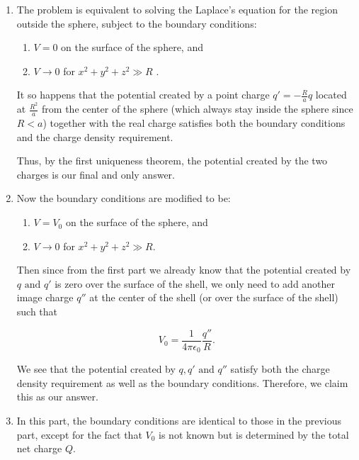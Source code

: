 \documentclass[english,a4paper,12pt]{report}
\begin{document}
{\begin{enumerate}
    \item The problem is equivalent to solving the Laplace's equation for the region outside the sphere, subject to the boundary conditions: 
    
    \begin{enumerate}[itemsep=10pt] 
        \item \(V = 0\) on the surface of the sphere, and
        \item \(V \rightarrow 0\) for  \(x^2 + y^2 + z^2 \gg R\) .		
    \end{enumerate} 
    
    It so happens that the potential created by a point charge \(q' = -\frac{R}{a} q\) located at \(\frac{R^2}{a} \) from the center of the sphere (which always stay inside the sphere since \(R < a\)) together with the real charge satisfies both the boundary conditions and the charge density requirement. 
    
    Thus, by the first uniqueness theorem, the potential created by the two charges is our final and only answer.\newline 
    
    \item Now the boundary conditions are modified to be:
    
    \begin{enumerate}
        \item \(V = V_0\) on the surface of the sphere, and
        \item \(V \rightarrow 0\) for \(x^2 + y^2 + z^2 \gg R\).	 
    \end{enumerate}
    
    Then since from the first part we already know that the potential created by \(q \text{ and } q'\) is zero over the surface of the shell, we only need to add another image charge \(q''\) at the center of the shell (or over the surface of the shell) such that 
    
    \begin{equation}
        V_0 = \frac{1}{4\pi\epsilon_0} \frac{q''}{R}.
    \end{equation}
    
    We see that the potential created by \(q, q' \text{ and } q''\) satisfy both the charge density requirement as well as the boundary conditions. Therefore, we claim this as our answer. \newline
    
    \item In this part, the boundary conditions are identical to those in the previous part, except for the fact that \(V_0\) is not known but is determined by the total net charge \(Q\). 
    

\end{enumerate}}
\end{document}
